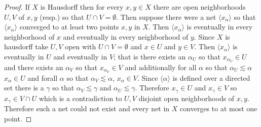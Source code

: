 \documentclass[11pt]{amsart}
\theoremstyle{definition}
\numberwithin{theorem}{section}
\numberwithin{definition}{section}
\numberwithin{equation}{section}
\newcommand{\abr}[1]{ \langle  #1 \rangle}
\begin{document}
\begin{proof}
	If $X$ is Hausdorff then for every $x,y \in X$ there are open neighborhoods $U, V$ of $x,y$ (resp.) so that $U \cap V = \emptyset. $ Then suppose there were a net $\abr{x_\alpha}$ so that $\abr{x_\alpha}$ converged to at least two points $x,y$ in $X$. Then $\abr{x_\alpha}$ is eventually in every neighborhood of $x$ and eventually in every neighborhood of $y$. Since $X$ is hausdorff take $U,V$ open with $U \cap V = \emptyset$ and $x \in U$ and $y \in V$. Then $\abr{x_\alpha}$ is eventually in $U$ and eventually in $V$; that is there exists an $\alpha_U$ so that $x_{\alpha_U} \in U$ and there exists an $\alpha_V$ so that $x_{\alpha_V} \in V$ and additionally for all $\alpha$ so that $\alpha_U \lesssim \alpha$ $x_\alpha \in U$ and forall $\alpha$ so that $\alpha_V \lesssim \alpha$, $x_\alpha \in V$. Since $\abr{\alpha}$ is defined over a directed set there is a $\gamma$ so that $\alpha_V \lesssim \gamma$ and $\alpha_U \lesssim \gamma$. Therefore $x_\gamma \in U$ and $x_\gamma \in V$ so $x_\gamma \in V \cap U$ which is a contradiction to $U, V$ disjoint open neighborhoods of $x, y$. Therefore such a net could not exist and every net in $X$ converges to at most one point.
\end{proof}
\end{document}
